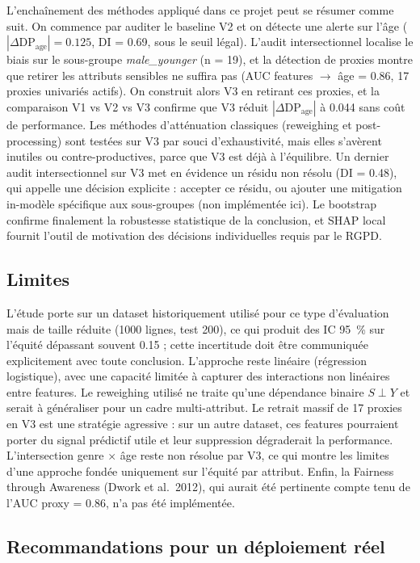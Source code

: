 \documentclass[11pt, a4paper]{article}
\begin{document}
L'enchaînement des méthodes appliqué dans ce projet peut se résumer comme suit. On commence par auditer le baseline V2 et on détecte une alerte sur l'âge ($|\Delta\text{DP}_{\text{age}}| = 0.125$, DI = 0.69, sous le seuil légal). L'audit intersectionnel localise le biais sur le sous-groupe \emph{male\_younger} (n = 19), et la détection de proxies montre que retirer les attributs sensibles ne suffira pas (AUC features $\to$ âge = 0.86, 17 proxies univariés actifs). On construit alors V3 en retirant ces proxies, et la comparaison V1 vs V2 vs V3 confirme que V3 réduit $|\Delta\text{DP}_{\text{age}}|$ à 0.044 sans coût de performance. Les méthodes d'atténuation classiques (reweighing et post-processing) sont testées sur V3 par souci d'exhaustivité, mais elles s'avèrent inutiles ou contre-productives, parce que V3 est déjà à l'équilibre. Un dernier audit intersectionnel sur V3 met en évidence un résidu non résolu (DI = 0.48), qui appelle une décision explicite : accepter ce résidu, ou ajouter une mitigation in-modèle spécifique aux sous-groupes (non implémentée ici). Le bootstrap confirme finalement la robustesse statistique de la conclusion, et SHAP local fournit l'outil de motivation des décisions individuelles requis par le RGPD.

\subsection{Limites}

L'étude porte sur un dataset historiquement utilisé pour ce type d'évaluation mais de taille réduite (1000 lignes, test 200), ce qui produit des IC 95~\% sur l'équité dépassant souvent 0.15 ; cette incertitude doit être communiquée explicitement avec toute conclusion. L'approche reste linéaire (régression logistique), avec une capacité limitée à capturer des interactions non linéaires entre features. Le reweighing utilisé ne traite qu'une dépendance binaire $S \perp Y$ et serait à généraliser pour un cadre multi-attribut. Le retrait massif de 17 proxies en V3 est une stratégie agressive : sur un autre dataset, ces features pourraient porter du signal prédictif utile et leur suppression dégraderait la performance. L'intersection genre $\times$ âge reste non résolue par V3, ce qui montre les limites d'une approche fondée uniquement sur l'équité par attribut. Enfin, la Fairness through Awareness (Dwork et al.\ 2012), qui aurait été pertinente compte tenu de l'AUC proxy = 0.86, n'a pas été implémentée.

\subsection{Recommandations pour un déploiement réel}
\end{document}
